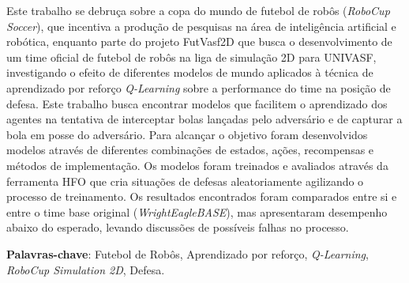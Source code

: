 


\setlength{\absparsep}{18pt} %
\begin{resumo}


Este trabalho se debruça sobre a copa do mundo de futebol de robôs
(\textit{RoboCup Soccer}), que incentiva a produção de pesquisas na área de
inteligência artificial e robótica, enquanto parte do projeto FutVasf2D que
busca o desenvolvimento de um time oficial de futebol de robôs na liga de
simulação 2D para UNIVASF, investigando o efeito de diferentes modelos
de mundo aplicados à técnica de aprendizado por reforço \textit{Q-Learning}
sobre a performance do time na posição de defesa. Este trabalho busca encontrar
modelos que facilitem o aprendizado dos agentes na tentativa de interceptar
bolas lançadas pelo adversário e de capturar a bola em posse do adversário. Para
alcançar o objetivo foram desenvolvidos modelos através de diferentes
combinações de estados, ações, recompensas e métodos de implementação. Os
modelos foram treinados e avaliados através da ferramenta HFO que cria situações
de defesas aleatoriamente agilizando o processo de treinamento. Os resultados
encontrados foram comparados entre si e entre o time base original
(\textit{WrightEagleBASE}), mas apresentaram desempenho abaixo do esperado,
levando discussões de possíveis falhas no processo.


 \textbf{Palavras-chave}: Futebol de Robôs, Aprendizado por reforço, \textit{Q-Learning}, \textit{RoboCup Simulation 2D}, Defesa.

\end{resumo}


